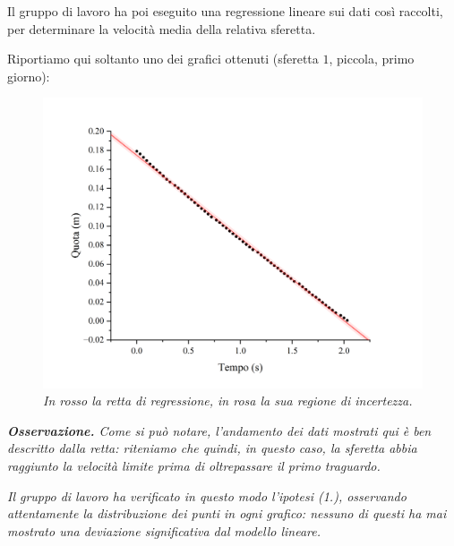 \documentclass{article}
\begin{document}
Il gruppo di lavoro ha poi eseguito una regressione lineare sui dati così
raccolti, per determinare la velocità media della relativa sferetta.

Riportiamo qui soltanto uno dei grafici ottenuti
(sferetta $1$, piccola, primo giorno):
\begin{figure}[H]
  \centering
  \includegraphics[trim={1.5cm 0.6cm 2cm 1cm},clip,width=\textwidth]{img/reg-p.png}
  \caption{\emph{
    In rosso la retta di regressione, in rosa la sua regione di incertezza.
  }}
\end{figure}

\emph{
  \textbf{Osservazione.} Come si può notare, l'andamento dei dati mostrati qui
  è ben descritto dalla retta: riteniamo che quindi, in questo caso, la sferetta
  abbia raggiunto la velocità limite prima di oltrepassare il primo traguardo.
}

\emph{
  Il gruppo di lavoro ha verificato in questo modo l'ipotesi (1.), osservando
  attentamente la distribuzione dei punti in ogni grafico: nessuno di questi
  ha mai mostrato una deviazione significativa dal modello lineare.
}
\end{document}
